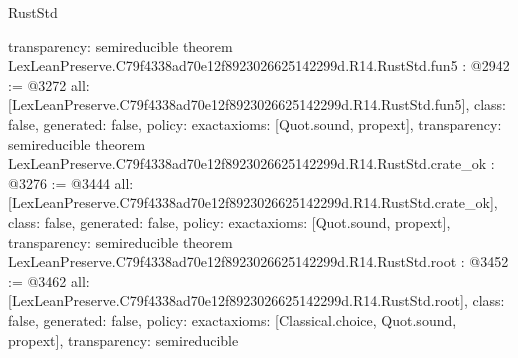 \begin{lexlean}{RustStd}
\begin{coremodule}
{  transparency: semireducible
}
theorem LexLeanPreserve.C79f4338ad70e12f8923026625142299d.R14.RustStd.fun5 : @2942 := @3272 {
  all: [LexLeanPreserve.C79f4338ad70e12f8923026625142299d.R14.RustStd.fun5],
  class: false,
  generated: false,
  policy: exact{axioms: [Quot.sound, propext]},
  transparency: semireducible
}
theorem LexLeanPreserve.C79f4338ad70e12f8923026625142299d.R14.RustStd.crate_ok : @3276 := @3444 {
  all: [LexLeanPreserve.C79f4338ad70e12f8923026625142299d.R14.RustStd.crate_ok],
  class: false,
  generated: false,
  policy: exact{axioms: [Quot.sound, propext]},
  transparency: semireducible
}
theorem LexLeanPreserve.C79f4338ad70e12f8923026625142299d.R14.RustStd.root : @3452 := @3462 {
  all: [LexLeanPreserve.C79f4338ad70e12f8923026625142299d.R14.RustStd.root],
  class: false,
  generated: false,
  policy: exact{axioms: [Classical.choice, Quot.sound, propext]},
  transparency: semireducible
}


\end{coremodule}
\end{lexlean}
